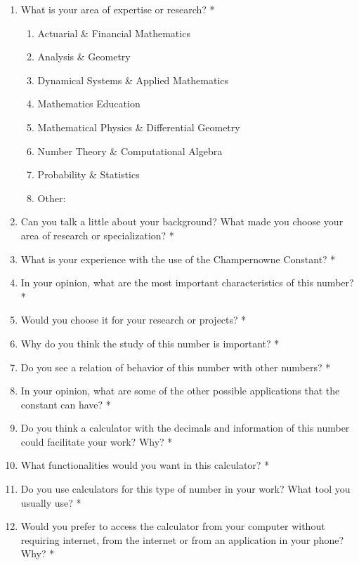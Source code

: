 \documentclass{article}
\begin{document}
\begin{enumerate}
\item{What is your area of expertise or research?\color{red} *}
    \begin{enumerate}
    \item Actuarial \& Financial Mathematics
    \item Analysis \& Geometry
    \item Dynamical Systems \& Applied Mathematics
    \item Mathematics Education
    \item Mathematical Physics \& Differential Geometry
    \item Number Theory \& Computational Algebra
    \item Probability \& Statistics
    \item Other: 
    \end{enumerate}

\item{Can you talk a little about your background? What made you choose your area of research or specialization?\color{red} *}
\item{What is your experience with the use of the Champernowne Constant? \color{red} *}
\item{In your opinion, what are the most important characteristics of this number? \color{red} *}
\item{Would you choose it for your research or projects?\color{red} *}
\item{Why do you think the study of this number is important?\color{red} *}
\item{Do you see a relation of behavior of this number with other numbers?\color{red} *}
\item{In your opinion, what are some of the other possible applications that the constant can have?\color{red} *}
\item{Do you think a calculator with the decimals and information of this number could facilitate your work? Why?\color{red} *}
\item{What functionalities would you want in this calculator?\color{red} *}
\item{Do you use calculators for this type of number in your work? What tool you usually use?\color{red} *}
\item{Would you prefer to access the calculator from your computer without requiring internet, from the internet or from an application in your phone? Why?\color{red} *}
\end{enumerate}
\end{document}
